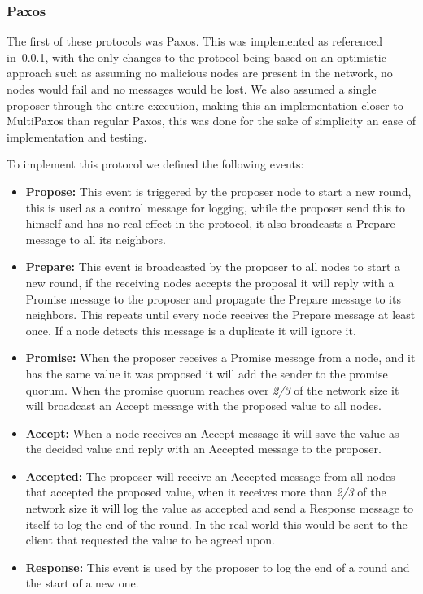 \subsubsection{Paxos}\label{sub:paxos}

The first of these protocols was Paxos. This was implemented as referenced in~\ref{sub:paxos},
with the only changes to the protocol being based on an optimistic approach such as assuming no malicious nodes
are present in the network, no nodes would fail and no messages would be lost. We also assumed a single proposer
through the entire execution, making this an implementation closer to MultiPaxos
than regular Paxos, this was done for the sake of simplicity an ease of implementation and testing.

To implement this protocol we defined the following events:
\begin{itemize}
	\item \textbf{Propose: } This event is triggered by the proposer node to start a new round, this is used
  as a control message for logging, while the proposer send this to himself and has no real effect in the protocol,
	it also broadcasts a Prepare message to all its neighbors.
  \item \textbf{Prepare: } This event is broadcasted by the proposer to all nodes to start a new round,
	if the receiving nodes accepts the proposal it will reply with a Promise message to the proposer and
	propagate the Prepare message to its neighbors. This repeats until every node receives the Prepare message
	at least once. If a node detects this message is a duplicate it will ignore it.
  \item \textbf{Promise: } When the proposer receives a Promise message from a node, and it has the same value it was proposed
	it will add the sender to the promise quorum. When the promise quorum reaches over \textit{2/3} of the network size it will
	broadcast an Accept message with the proposed value to all nodes.
  \item \textbf{Accept: } When a node receives an Accept message it will save the value as the decided value and reply
	with an Accepted message to the proposer.
  \item \textbf{Accepted: } The proposer will receive an Accepted message from all nodes that accepted the proposed value,
	when it receives more than \textit{2/3} of the network size it will log the value as accepted and send a Response message
	to itself to log the end of the round. In the real world this would be sent to the client that requested the value to be agreed upon.
  \item \textbf{Response: }	This event is used by the proposer to log the end of a round and the start of a new one.
\end{itemize}

